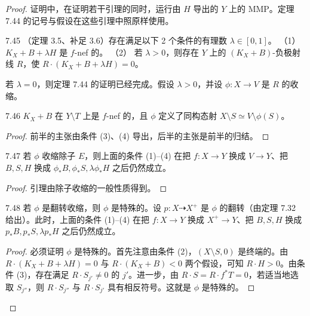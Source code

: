 \begin{proof}
证明中，在证明若干引理的同时，运行由 $H$ 导出的 $Y$ 上的 MMP。定理 7.44 的记号与假设在这些引理中照原样使用。

\begin{lemma}{7.45}
（定理 3.5、补足 3.6）存在满足以下 2 个条件的有理数 $\lambda\in[0,1]$。
（1） $K_X+B+\lambda H$ 是 $f$-nef 的。
（2） 若 $\lambda>0$，则存在 $Y$ 上的 $(K_X+B)$-负极射线 $R$，使 $R\cdot(K_X+B+\lambda H)=0$。
\end{lemma}

若 $\lambda=0$，则定理 7.44 的证明已经完成。假设 $\lambda>0$，并设 $\phi\colon X\to V$ 是 $R$ 的收缩。

\begin{lemmap}{7.46}
$K_X+B$ 在 $Y\setminus T$ 上是 $f$-nef 的，且 $\phi$ 定义了同构态射 $X\setminus S\simeq V\setminus\phi(S)$。
\end{lemmap}

\begin{proof}
前半的主张由条件 (3)、(4) 导出，后半的主张是前半的归结。
\end{proof}

\begin{lemmap}{7.47}
若 $\phi$ 收缩除子 $E$，则上面的条件 (1)–(4) 在把 $f\colon X\to Y$ 换成 $V\to Y$、把 $B,S,H$ 换成 $\phi_*B,\phi_*S,\lambda\phi_*H$ 之后仍然成立。
\end{lemmap}

\begin{proof}
引理由除子收缩的一般性质得到。
\end{proof}

\begin{lemmap}{7.48}
若 $\phi$ 是翻转收缩，则 $\phi$ 是特殊的。设 $p\colon X\dashrightarrow X^+$ 是 $\phi$ 的翻转（由定理 7.32 给出）。此时，上面的条件 (1)–(4) 在把 $f\colon X\to Y$ 换成 $X^+\to Y$、把 $B,S,H$ 换成 $p_*B,p_*S,\lambda p_*H$ 之后仍然成立。
\end{lemmap}

\begin{proof}
必须证明 $\phi$ 是特殊的。首先注意由条件 (2)，$(X\setminus S,0)$ 是终端的。由 $R\cdot(K_X+B+\lambda H)=0$ 与 $R\cdot(K_X+B)<0$ 两个假设，可知 $R\cdot H>0$。由条件 (3)，存在满足 $R\cdot S_{j'}\ne0$ 的 $j'$。进一步，由 $R\cdot S=R\cdot f^*T=0$，若适当地选取 $S_{j''}$，则 $R\cdot S_{j''}$ 与 $R\cdot S_{j'}$ 具有相反符号。这就是 $\phi$ 是特殊的。
\end{proof}


\end{proof}
